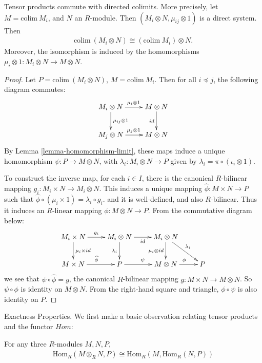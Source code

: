 \begin{lemma}
\label{lemma-tensor-products-commute-with-limits}
Tensor products commute with directed colimits.
More precisely, let 
$M=\text{colim}\ {M_i}$,
and $N$ an $R$-module. Then $(M_i\otimes N, \mu_{ij}\otimes 1)$
is a direct  system. Then
\begin{align}
\text{colim}\ (M_i\otimes N) \cong (\text{colim}\ M_i)\otimes N.
\end{align}
Moreover, the isomorphism is induced by the homomorphisms $\mu_i\otimes 1: 
M_i\otimes N \rightarrow M\otimes N$.
\end{lemma}

\begin{proof}
Let $P=\text{colim}\ (M_i\otimes N)$, $M=\text{colim}\ M_i$. 
Then for all $i\preceq j$, the
following diagram commutes:
\[
\xymatrix{
    M_i\otimes N \ar[r]^{\mu_{i}\otimes 1} \ar[d]^{\mu_{ij}\otimes 1}&M\otimes 
N\ar[d]_{id} \\
    M_j\otimes N \ar[r]^{\mu_{j}\otimes 1} &M\otimes N
}
\]
By Lemma \ref{lemma-homomorphism-limit},
these maps induce a unique homomorphism 
$\psi:P\rightarrow M\otimes N$, with
$\lambda_{i}:M_i\otimes
N\rightarrow P$ given by $\lambda_{i}=\pi \circ (\iota_{i}\otimes 1)$.

\medskip\noindent
To construct the inverse map, for each $i\in I$, there is the canonical 
$R$-bilinear mapping $g_i:M_i\times N\rightarrow
M_i \otimes N$. This induces a unique mapping
$\widehat{\phi}:M\times N\rightarrow P$ 
such that $\widehat{\phi}\circ
(\mu_i\times 1)=\lambda_i\circ g_i$. and it is well-defined, and also 
$R$-bilinear. Thus it induces an
$R$-linear mapping $\phi: M\otimes N\rightarrow P$.
From the commutative diagram below:
\[ \xymatrix{
    M_i\times N \ar[r]^{g_i} \ar[d]^{\mu_{i}\times id}&M_i\otimes N\ar[r]_{id} 
\ar[d]_{\lambda_i}
    &M_i\otimes N \ar[d]_{\mu_i\otimes id} \ar[rd]^{\lambda_i}\\
    M\times N \ar[r]^{\widehat{\phi}} &P \ar[r]^{\psi} &M\otimes N 
\ar[r]^{\phi} &P
    }
\]
we see that $\psi\circ\widehat{\phi}=g$, the canonical $R$-bilinear mapping 
$g:M\times N\rightarrow M\otimes N$. So
$\psi\circ\phi$ is identity on $M\otimes N$. From the right-hand square and 
triangle, $\phi\circ\psi$ is also
identity on $P$.
\end{proof}

\noindent
Exactness Properties.
\label{exact}
We first make a basic observation relating tensor products and 
the functor $Hom$:

\begin{lemma}
\label{lemma-hom-from-tensor-product}
For any three $R$-modules $M,N,P$,
\begin{align}
\text{Hom}_R(M\otimes_R N, P)\cong \text{Hom}_R(M,\text{Hom}_R(N,P))
\end{align}
\end{lemma}

